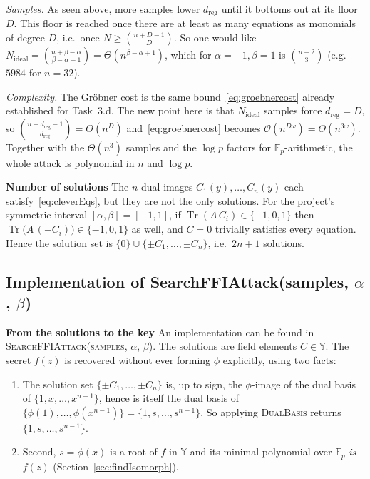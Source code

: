 \documentclass{article}
\DeclareMathOperator{\Tr}{Tr}
\begin{document}
\emph{Samples.} As seen above, more samples lower $d_{\mathrm{reg}}$ until it bottoms out at its floor $D$. This floor is reached once there are at least as many equations as monomials of degree $D$, i.e.\ once $N\ge\binom{n+D-1}{D}$. So one would like $N_{\mathrm{ideal}}=\binom{n+\beta-\alpha}{\beta-\alpha+1}=\Theta\!\left(n^{\beta-\alpha+1}\right)$,
which for $\alpha=-1,\beta=1$ is $\binom{n+2}{3}$ (e.g.\ $5984$ for $n=32$).

\emph{Complexity.} The Gröbner cost is the same bound~\eqref{eq:groebnercost} already established for Task~3.d. The new point here is that $N_{\mathrm{ideal}}$ samples force $d_{\mathrm{reg}}=D$, so $\binom{n+d_{\mathrm{reg}}-1}{d_{\mathrm{reg}}}=\Theta(n^{D})$ and~\eqref{eq:groebnercost} becomes $\mathcal{O}(n^{D\omega})=\Theta(n^{3\omega})$. Together with the $\Theta(n^{3})$ samples and the $\log p$ factors for $\mathbb{F}_p$-arithmetic, the whole attack is polynomial in $n$ and $\log p$.

\textbf{Number of solutions}
The $n$ dual images $C_1(y),\dots,C_n(y)$ each satisfy~\eqref{eq:cleverEqs}, but they are not the only solutions. For the project's symmetric interval $[\alpha,\beta]=[-1,1]$, if $\Tr(A\,C_i)\in\{-1,0,1\}$ then $\Tr\bigl(A\,(-C_i)\bigr)\in\{-1,0,1\}$ as well, and $C=0$ trivially satisfies every equation. Hence the solution set is $\{0\}\cup\{\pm C_1,\dots,\pm C_n\}$, i.e.\ $2n+1$ solutions.

\subsection{Implementation of SearchFFIAttack(samples, $\alpha$, $\beta$)}
\label{sec:searchffiattack}
\textbf{From the solutions to the key}
An implementation can be found in \textsc{SearchFFIAttack(samples, $\alpha$, $\beta$)}. The solutions are field elements $C\in\mathbb{Y}$. The secret $f(z)$ is recovered without ever forming $\phi$ explicitly, using two facts:
\begin{enumerate}
  \item The solution set $\{\pm C_1,\dots,\pm C_n\}$ is, up to sign, the $\phi$-image of the dual basis of $\{1,x,\dots,x^{n-1}\}$, hence is itself the dual basis of $\{\phi(1),\dots,\phi(x^{n-1})\}=\{1,s,\dots,s^{n-1}\}$. So applying \textsc{DualBasis} returns $\{1,s,\dots,s^{n-1}\}$.
  \item Second, $s=\phi(x)$ is a root of $f$ in $\mathbb{Y}$ and its minimal polynomial over $\mathbb{F}_p$ \emph{is} $f(z)$ (Section~\ref{sec:findIsomorph}).
\end{enumerate}
\end{document}
